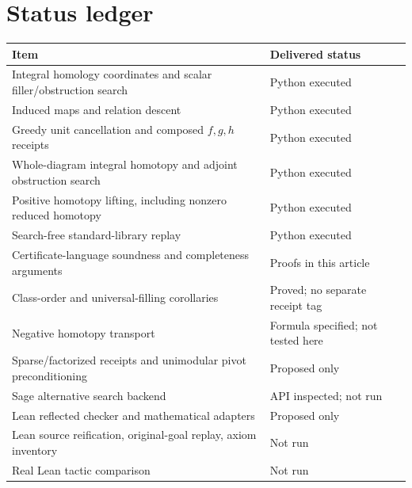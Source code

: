 \documentclass[11pt,letterpaper]{article}
\theoremstyle{definition}\newtheorem{definition}[theorem]{Definition}
\theoremstyle{remark}\newtheorem{remark}[theorem]{Remark}
\begin{document}
\section{Status ledger}
\begin{longtable}{@{}p{}p{}@{}}
\toprule
Item & Delivered status\\
\midrule\endhead
Integral homology coordinates and scalar filler/obstruction search & Python executed\\
Induced maps and relation descent & Python executed\\
Greedy unit cancellation and composed $f,g,h$ receipts & Python executed\\
Whole-diagram integral homotopy and adjoint obstruction search & Python executed\\
Positive homotopy lifting, including nonzero reduced homotopy & Python executed\\
Search-free standard-library replay & Python executed\\
Certificate-language soundness and completeness arguments & Proofs in this article\\
Class-order and universal-filling corollaries & Proved; no separate receipt tag\\
Negative homotopy transport & Formula specified; not tested here\\
Sparse/factorized receipts and unimodular pivot preconditioning & Proposed only\\
Sage alternative search backend & API inspected; not run\\
Lean reflected checker and mathematical adapters & Proposed only\\
Lean source reification, original-goal replay, axiom inventory & Not run\\
Real Lean tactic comparison & Not run\\
\bottomrule
\end{longtable}
\end{document}
